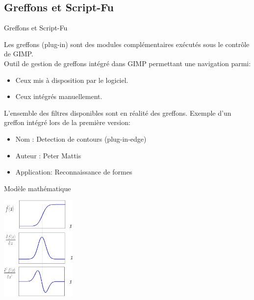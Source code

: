 \documentclass[french]{beamer}
\begin{document}
        \subsection{Greffons et Script-Fu}
            \begin{frame}{Greffons et Script-Fu}
                \tableofcontents[sectionstyle=show/hide,subsectionstyle=show/shaded/hide]
            \end{frame}
            \begin{frame}
                Les greffons (plug-in) sont des modules complémentaires  exécutés sous le contrôle de GIMP.
                \\Outil de gestion de greffons intégré dans GIMP permettant une navigation parmi:
                \begin{itemize}
                    \item Ceux mis à disposition par le logiciel.
                    \item Ceux intégrés manuellement.
                \end{itemize}
                L'ensemble des filtres disponibles sont en réalité des greffons.
                Exemple d'un greffon intégré lors de la première version:
                \begin{itemize}
                    \item Nom : Detection de contours (plug-in-edge)
                    \item Auteur : Peter Mattis
                    \item Application: Reconnaissance de formes
                \end{itemize}
            \end{frame}
            \begin{frame}
                \begin{exampleblock}{Modèle mathématique}
	               \begin{center}
	                    \includegraphics[width=3.7cm]{courbes_gradient.jpg}
	               \end{center}
            	\end{exampleblock}
            \end{frame}
\end{document}
